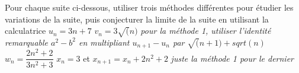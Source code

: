 \begin{questions}
\exercice 
\question Pour chaque suite ci-dessous, utiliser trois méthodes différentes pour étudier les variations de la suite, puis conjecturer la limite de la suite en utilisant la calculatrice
\subpart $u_n = 3n+7$
\subpart $v_n = 3\sqrt(n)$                           \textit{pour la méthode 1, utiliser l'identité remarquable $a^2 - b^2$ en multipliant $u_{n+1} - u_n$ par $\sqrt(n+1) + sqrt(n)$}
\subpart $w_n = \dfrac{2n^2+2}{3n^2+3}$              
\subpart $x_n = 3$ et $x_{n+1} = x_n + 2n^2+2$       \textit{juste la méthode 1 pour le dernier}


\end{questions}
